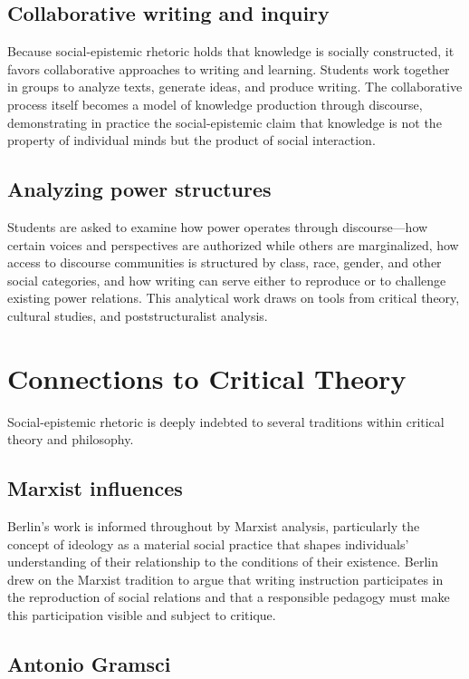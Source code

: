 \documentclass[12pt]{article}
\begin{document}
\subsection*{Collaborative writing and inquiry}

Because social-epistemic rhetoric holds that knowledge is socially constructed, it favors collaborative approaches to writing and learning. Students work together in groups to analyze texts, generate ideas, and produce writing. The collaborative process itself becomes a model of knowledge production through discourse, demonstrating in practice the social-epistemic claim that knowledge is not the property of individual minds but the product of social interaction.

\subsection*{Analyzing power structures}

Students are asked to examine how power operates through discourse---how certain voices and perspectives are authorized while others are marginalized, how access to discourse communities is structured by class, race, gender, and other social categories, and how writing can serve either to reproduce or to challenge existing power relations. This analytical work draws on tools from critical theory, cultural studies, and poststructuralist analysis.

\section{Connections to Critical Theory}

Social-epistemic rhetoric is deeply indebted to several traditions within critical theory and philosophy.

\subsection*{Marxist influences}

Berlin's work is informed throughout by Marxist analysis, particularly the concept of ideology as a material social practice that shapes individuals' understanding of their relationship to the conditions of their existence. Berlin drew on the Marxist tradition to argue that writing instruction participates in the reproduction of social relations and that a responsible pedagogy must make this participation visible and subject to critique.

\subsection*{Antonio Gramsci}
\end{document}

